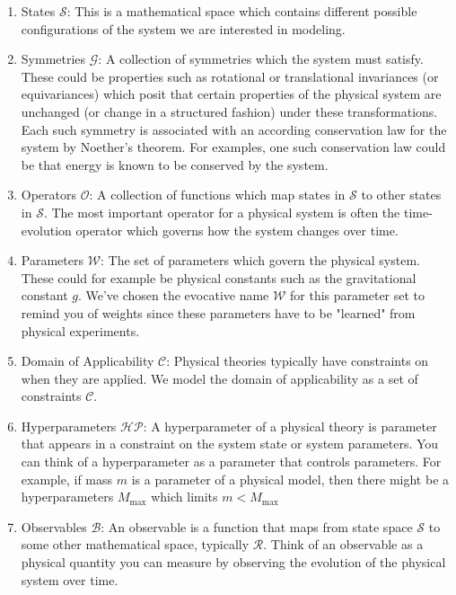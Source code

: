 \documentclass[book.tex]{subfiles}
\begin{document}
\begin{enumerate}
    \item States $\mathcal{S}$: This is a mathematical space which contains different possible configurations of the system we are interested in modeling.
    \item Symmetries $\mathcal{G}$: A collection of symmetries which the system must satisfy. These could be properties such as rotational or translational invariances (or equivariances) which posit that certain properties of the physical system are unchanged (or change in a structured fashion) under these transformations. Each such symmetry is associated with an according conservation law for the system by Noether's theorem. For examples, one such conservation law could be that energy is known to be conserved by the system.
    \item Operators $\mathcal{O}$: A collection of functions which map states in $\mathcal{S}$ to other states in $\mathcal{S}$. The most important operator for a physical system is often the time-evolution operator which governs how the system changes over time.
    \item Parameters $\mathcal{W}$: The set of parameters which govern the physical system. These could for example be physical constants such as the gravitational constant $g$. We've chosen the evocative name $\mathcal{W}$ for this parameter set to remind you of weights since these parameters have to be "learned" from physical experiments.
    \item Domain of Applicability $\mathcal{C}$: Physical theories typically have constraints on when they are applied. We model the domain of applicability as a set of constraints $\mathcal{C}$.
    \item Hyperparameters $\mathcal{HP}$: A hyperparameter of a physical theory is parameter that appears in a constraint on the system state or system parameters. You can think of a hyperparameter as a parameter that controls parameters. For example, if mass $m$ is a parameter of a physical model, then there might be a hyperparameters $M_{\textrm{max}}$ which limits $m < M_{\textrm{max}}$
    \item Observables $\mathcal{B}$: An observable is a function that maps from state space $\mathcal{S}$ to some other mathematical space, typically $\mathcal{R}$. Think of an observable as a physical quantity you can measure by observing the evolution of the physical system over time. 
\end{enumerate}
\end{document}
